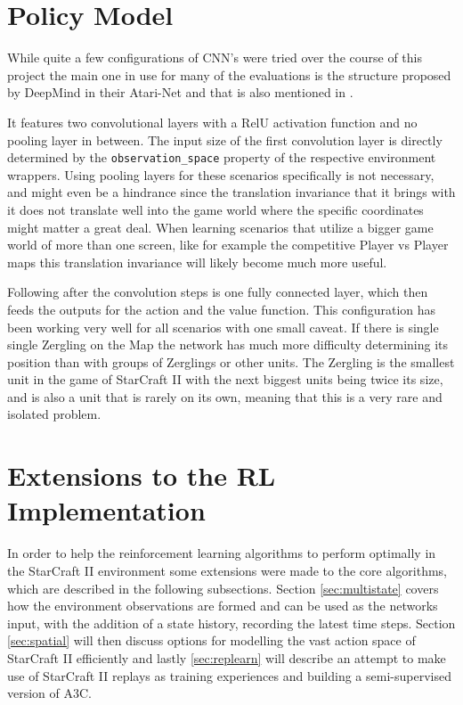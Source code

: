 \section{Policy Model}
\label{sec:polmodel}
While quite a few configurations of CNN's were tried over the course of this project the main one in use for many of the evaluations is the structure proposed by DeepMind in their Atari-Net and that is also mentioned in \citep{sc2}.

It features two convolutional layers with a RelU activation function and no pooling layer in between.
The input size of the first convolution layer is directly determined by the \lstinline{observation_space} property of the respective environment wrappers.
Using pooling layers for these scenarios specifically is not necessary, and might even be a hindrance since the translation invariance that it brings with it does not translate well into the game world where the specific coordinates might matter a great deal. When learning scenarios that utilize a bigger game world of more than one screen, like for example the competitive Player vs Player maps this translation invariance will likely become much more useful.

Following after the convolution steps is one fully connected layer, which then feeds the outputs for the action and the value function. This configuration has been working very well for all scenarios with one small caveat. If there is single single Zergling on the Map the network has much more difficulty determining its position than with groups of Zerglings or other units. The Zergling is the smallest unit in the game of StarCraft II with the next biggest units being twice its size, and is also a unit that is rarely on its own, meaning that this is a very rare and isolated problem.




\section{Extensions to the RL Implementation}
\label{sec:extensions}
In order to help the reinforcement learning algorithms to perform optimally in the StarCraft II environment some extensions were made to the core algorithms, which are described in the following subsections. Section \ref{sec:multistate} covers how the environment observations are formed and can be used as the networks input, with the addition of a state history, recording the latest time steps. Section \ref{sec:spatial} will then discuss options for modelling the vast action space of StarCraft II efficiently and lastly \ref{sec:replearn} will describe an attempt to make use of StarCraft II replays as training experiences and building a semi-supervised version of A3C.

